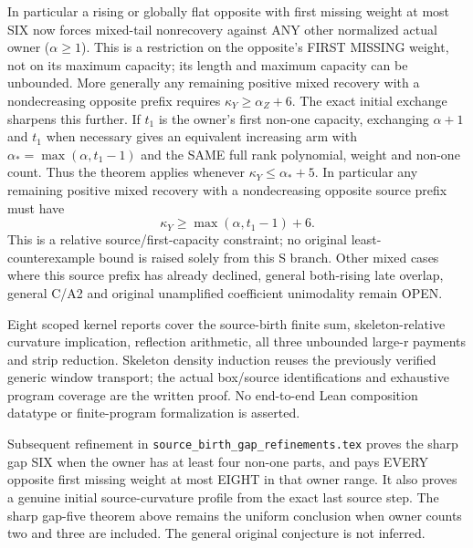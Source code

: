 In particular a rising or globally flat opposite with first missing
weight at most SIX now forces mixed-tail nonrecovery against ANY
other normalized actual owner ($\alpha\ge1$). This is a restriction
on the opposite's FIRST MISSING weight, not on its maximum capacity;
its length and maximum capacity can be unbounded.
More generally any remaining positive mixed recovery with a
nondecreasing opposite prefix requires $\kappa_Y\ge\alpha_Z+6$.
The exact initial exchange sharpens this further. If $t_1$ is the
owner's first non-one capacity, exchanging $\alpha+1$ and $t_1$
when necessary gives an equivalent increasing arm with
$\alpha_* =\max(\alpha,t_1-1)$ and the SAME full rank polynomial,
weight and non-one count. Thus the theorem applies whenever
$\kappa_Y\le\alpha_*+5$. In particular any remaining positive
mixed recovery with a nondecreasing opposite source prefix must have
\[
                     \kappa_Y\ge\max(\alpha,t_1-1)+6.
\]
This is a relative source/first-capacity constraint; no original
least-counterexample bound is raised solely from this S branch.
Other mixed cases where this source prefix has already declined,
general both-rising late overlap, general C/A2 and original
unamplified coefficient unimodality remain OPEN.

Eight scoped kernel reports cover the source-birth finite sum,
skeleton-relative curvature implication, reflection arithmetic,
all three unbounded large-r payments and strip reduction.
Skeleton density induction reuses the previously verified generic
window transport; the actual box/source identifications and exhaustive
program coverage are the written proof. No end-to-end Lean composition
datatype or finite-program formalization is asserted.

Subsequent refinement in \texttt{source\_birth\_gap\_refinements.tex}
proves the sharp gap SIX when the owner has at least four non-one
parts, and pays EVERY opposite first missing weight at most EIGHT
in that owner range. It also proves a genuine initial source-curvature
profile from the exact last source step. The sharp gap-five theorem
above remains the uniform conclusion when owner counts two and three
are included. The general original conjecture is not inferred.
